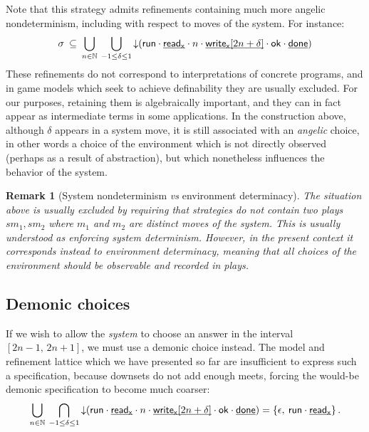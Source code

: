 \documentclass[11pt,oneside,draft]{book}
\newtheorem{remark}[theorem]{Remark}
\theoremstyle{definition}
\newcommand{\kw}[1]{\ensuremath{ \mathsf{#1} }}
\newcommand{\ul}[1]{%
  \underline{\smash{#1}}
}
\begin{document}
Note that this strategy admits refinements
containing much more angelic nondeterminism,
including with respect to moves of the system.
For instance:
\[
  \sigma \: \subseteq \:
    \bigcup_{n \in \mathbb{N}} \:
    \bigcup_{-1 \le \delta \le 1}
    {\downarrow}(
      \kw{run} \cdot
      \ul{\kw{read}_\kw{x}} \cdot n \cdot
      \ul{\kw{write}_\kw{x}[2n + \delta]} \cdot \kw{ok} \cdot
      \ul{\kw{done}})
\]
These refinements do not correspond to interpretations
of concrete programs,
and in game models which seek to achieve definability
they are usually excluded.
For our purposes,
retaining them is algebraically important,
and they can in fact appear as intermediate terms
in some applications.
In the construction above,
although $\delta$ appears in a system move,
it is still associated with an \emph{angelic} choice,
in other words a choice of the environment
which is not directly observed
(perhaps as a result of abstraction),
but which nonetheless influences the behavior of the system.

\begin{remark}[System nondeterminism \emph{vs} environment determinacy] %
The situation above is usually excluded
by requiring that strategies
do not contain two plays $s m_1, s m_2$
where $m_1$ and $m_2$ are distinct moves of the system.
This is usually understood as enforcing \emph{system determinism}.
However,
in the present context
it corresponds instead to \emph{environment determinacy},
meaning that all choices of the environment
should be observable and recorded in plays.
\end{remark}


\subsection{Demonic choices} %

If we wish to allow the \emph{system}
to choose an answer in the interval $[2n - 1, \, 2n + 1]$,
we must use a demonic choice instead.
The model and refinement lattice which
we have presented so far are insufficient
to express such a specification,
because downsets do not add enough meets,
forcing the would-be demonic specification to become
much coarser:
\[
    \bigcup_{n \in \mathbb{N}} \:
    \bigcap_{-1 \le \delta \le 1}
    {\downarrow}(
      \kw{run} \cdot
      \ul{\kw{read}_\kw{x}} \cdot n \cdot
      \ul{\kw{write}_\kw{x}[2n + \delta]} \cdot \kw{ok} \cdot
      \ul{\kw{done}}) =
      \{ \epsilon,  \: \kw{run} \cdot \ul{\kw{read}_\kw{x}} \}
    \,.
\]
\end{document}
